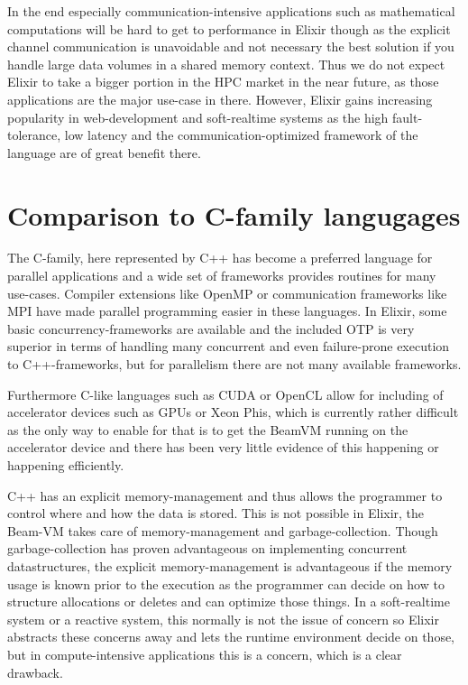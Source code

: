 \documentclass[]{paper}
\begin{document}
In the end especially communication-intensive applications such as mathematical computations will be hard to get to performance in Elixir though as the explicit channel communication is unavoidable and not necessary the best solution if you handle large data volumes in a shared memory context. Thus we do not expect Elixir to take a bigger portion in the HPC market in the near future, as those applications are the major use-case in there. However, Elixir gains increasing popularity in web-development and soft-realtime systems as the high fault-tolerance, low latency and the communication-optimized framework of the language are of great benefit there.

\section{Comparison to C-family langugages}

The C-family, here represented by C++ has become a preferred language for parallel applications and a wide set of frameworks provides routines for many use-cases. Compiler extensions like OpenMP\cite{OpenMP} or communication frameworks like MPI \cite{MPI} have made parallel programming easier in these languages. In Elixir, some basic concurrency-frameworks are available and the included OTP is very superior in terms of handling many concurrent and even failure-prone execution to C++-frameworks, but for parallelism there are not many available frameworks. 

Furthermore C-like languages such as CUDA or OpenCL allow for including of accelerator devices such as GPUs or Xeon Phis, which is currently rather difficult as the only way to enable for that is to get the BeamVM running on the accelerator device and there has been very little evidence of this happening or happening efficiently.

C++ has an explicit memory-management and thus allows the programmer to control where and how the data is stored. This is not possible in Elixir, the Beam-VM takes care of memory-management and garbage-collection. Though garbage-collection has proven advantageous on implementing concurrent datastructures, the explicit memory-management is advantageous if the memory usage is known prior to the execution as the programmer can decide on how to structure allocations or deletes and can optimize those things. In a soft-realtime system or a reactive system, this normally is not the issue of concern so Elixir abstracts these concerns away and lets the runtime environment decide on those, but in compute-intensive applications this is a concern, which is a clear drawback.
\end{document}
